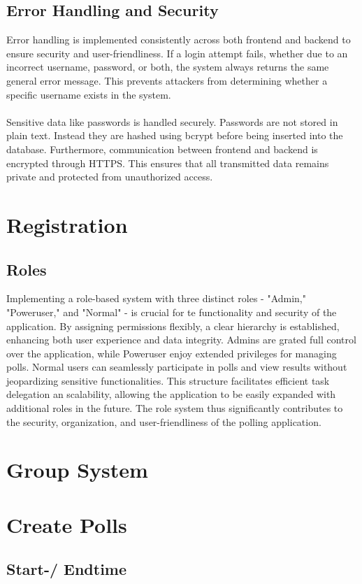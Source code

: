 \documentclass[a4paper,12pt]{report}
\begin{document}
\subsection{Error Handling and Security}
Error handling is implemented consistently across both frontend and backend to ensure security and user-friendliness. If a login attempt fails, whether due to an incorrect username, password, or both, the system always returns the same general error message. This prevents attackers from determining whether a specific username exists in the system.\\\\
Sensitive data like passwords is handled securely. Passwords are not stored in plain text. Instead they are hashed using bcrypt before being inserted into the database. Furthermore, communication between frontend and backend is encrypted through HTTPS. This ensures that all transmitted data remains private and protected from unauthorized access.

\section{Registration}
\subsection{Roles}
Implementing a role-based system with three distinct roles - "Admin," "Poweruser," and "Normal" - is crucial for te functionality and security of the application. By assigning permissions flexibly, a clear hierarchy is established, enhancing both user experience and data integrity. Admins are grated full control over the application, while Poweruser enjoy extended privileges for managing polls. Normal users can seamlessly participate in polls and view results without jeopardizing sensitive functionalities. This structure facilitates efficient task delegation an scalability, allowing the application to be easily expanded with additional roles  in the future. The role system thus significantly contributes to the security, organization, and user-friendliness of the polling application.
\section{Group System}
\section{Create Polls}
\subsection{Start-/ Endtime}
\end{document}
